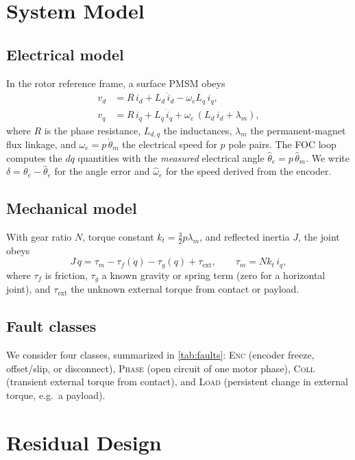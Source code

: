 \documentclass[conference]{IEEEtran}
\begin{document}
\section{System Model}
\label{sec:model}

\subsection{Electrical model}
In the rotor reference frame, a surface PMSM obeys
\begin{align}
  v_d &= R\,i_d + L_d\,\dot i_d - \omega_e L_q\, i_q, \label{eq:vd}\\
  v_q &= R\,i_q + L_q\,\dot i_q + \omega_e\,(L_d\, i_d + \lambda_m), \label{eq:vq}
\end{align}
where $R$ is the phase resistance, $L_{d,q}$ the inductances, $\lambda_m$ the
permanent-magnet flux linkage, and $\omega_e = p\,\dot\theta_m$ the electrical
speed for $p$ pole pairs. The FOC loop computes the $dq$ quantities with the
\emph{measured} electrical angle $\hat\theta_e = p\,\hat\theta_m$. We write
$\delta = \theta_e - \hat\theta_e$ for the angle error and
$\hat\omega_e$ for the speed derived from the encoder.

\subsection{Mechanical model}
With gear ratio $N$, torque constant $k_t = \tfrac{3}{2}p\lambda_m$, and
reflected inertia $J$, the joint obeys
\begin{equation}
  J\,\ddot q = \tau_m - \tau_f(\dot q) - \tau_g(q) + \tau_\mathrm{ext},
  \qquad \tau_m = N k_t\, i_q, \label{eq:mech}
\end{equation}
where $\tau_f$ is friction, $\tau_g$ a known gravity or spring term (zero for
a horizontal joint), and $\tau_\mathrm{ext}$ the unknown external torque from
contact or payload.

\subsection{Fault classes}
We consider four classes, summarized in \cref{tab:faults}:
\textsc{Enc} (encoder freeze, offset/slip, or disconnect),
\textsc{Phase} (open circuit of one motor phase),
\textsc{Coll} (transient external torque from contact), and
\textsc{Load} (persistent change in external torque, e.g.\ a payload).

\section{Residual Design}
\label{sec:method}
\end{document}

